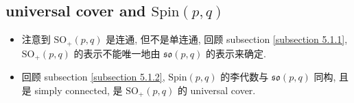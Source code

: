 \subsection{universal cover and \texorpdfstring{$\mathrm{Spin}(p, q)$}{Spin(p, q)}} \label{subsection 13.1.1}
\begin{itemize}
	\item 注意到 $\mathrm{SO}_+(p, q)$ 是连通, 但不是单连通, 回顾 subsection \ref{subsection 5.1.1}, $\mathrm{SO}_+(p, q)$ 的表示不能唯一地由 $\mathfrak{so}(p, q)$ 的表示来确定.
	
	\item 回顾 subsection \ref{subsection 5.1.2}, $\mathrm{Spin}(p, q)$ 的李代数与 $\mathfrak{so}(p, q)$ 同构, 且是 simply connected, 是 $\mathrm{SO}_+(p, q)$ 的 universal cover.
\end{itemize}

